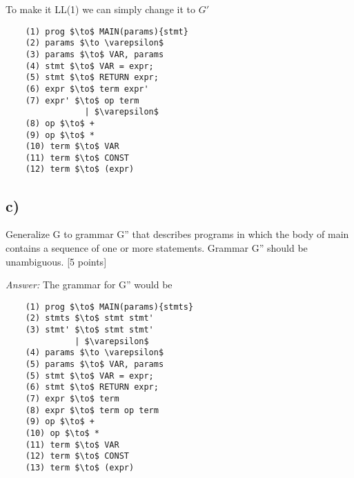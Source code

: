 \documentclass{article}
\begin{document}
To make it LL(1) we can simply change it to $G'$
\begin{lstlisting}
    (1) prog $\to$ MAIN(params){stmt}
    (2) params $\to \varepsilon$
    (3) params $\to$ VAR, params
    (4) stmt $\to$ VAR = expr;
    (5) stmt $\to$ RETURN expr;
    (6) expr $\to$ term expr'
    (7) expr' $\to$ op term
                | $\varepsilon$
    (8) op $\to$ +
    (9) op $\to$ *
    (10) term $\to$ VAR
    (11) term $\to$ CONST
    (12) term $\to$ (expr)
\end{lstlisting}



\subsection*{c)}
Generalize G to grammar G'' that describes programs in which the body of
main contains a sequence of one or more statements. Grammar G'' should 
be unambiguous. [5 points]

\textit{Answer:}
The grammar for G'' would be

\begin{lstlisting}
    (1) prog $\to$ MAIN(params){stmts}
    (2) stmts $\to$ stmt stmt' 
    (3) stmt' $\to$ stmt stmt'
              | $\varepsilon$
    (4) params $\to \varepsilon$
    (5) params $\to$ VAR, params
    (5) stmt $\to$ VAR = expr;
    (6) stmt $\to$ RETURN expr;
    (7) expr $\to$ term
    (8) expr $\to$ term op term 
    (9) op $\to$ +
    (10) op $\to$ *
    (11) term $\to$ VAR
    (12) term $\to$ CONST
    (13) term $\to$ (expr)
\end{lstlisting}
\end{document}
